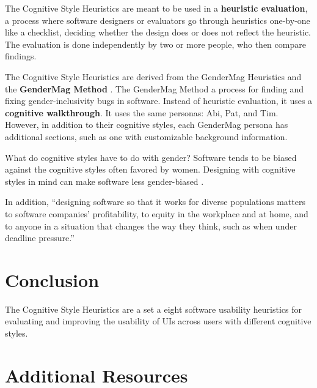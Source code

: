 \marginpar{\heuristicEvaluationDef\margindivider}


\marginpar{\genderMagMethodDef\margindivider}

\marginpar{\cognitiveWalkthroughDef}

The Cognitive Style Heuristics are meant to be used in a \textbf{heuristic evaluation}, a process where software designers or evaluators go through heuristics one-by-one like a checklist, deciding whether the design does or does not reflect the heuristic. The evaluation is done independently by two or more people, who then compare findings.

The Cognitive Style Heuristics are derived from the GenderMag Heuristics \parencite{gendermagheuristics} and the \textbf{GenderMag Method} \parencite{burnett16}. The GenderMag Method a process for finding and fixing gender-inclusivity bugs in software. Instead of heuristic evaluation, it uses a \textbf{cognitive walkthrough}. It uses the same personas: Abi, Pat, and Tim. However, in addition to their cognitive styles, each GenderMag persona has additional sections, such as one with customizable background information.

What do cognitive styles have to do with gender? Software tends to be biased against the cognitive styles often favored by women. Designing with cognitive styles in mind can make software less gender-biased \parencite{vorvoreanu19}.

In addition, ``designing software so that it works for diverse populations matters to software companies’ profitability, to equity in the workplace and at home, and to anyone in a situation that changes the way they think, such as when under deadline pressure.''\parencite{mendez19}

\section{Conclusion}

The Cognitive Style Heuristics are a set a eight software usability heuristics for evaluating and improving the usability of UIs across users with different cognitive styles.

\nomargins
\section{Additional Resources}

